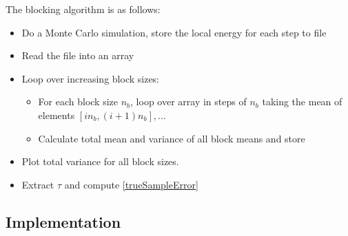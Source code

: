 \documentclass[english, a4paper]{article}
\begin{document}
\noindent The blocking algorithm is as follows:
\begin{itemize}
 \item Do a Monte Carlo simulation, store the local energy for each step to file
 \item Read the file into an array
 \item Loop over increasing block sizes:
 \begin{itemize}
     \item For each block size $n_b$, loop over array in steps of $n_b$ taking the mean of elements
           $[in_b, (i+1)n_b] , \dots $
     \item Calculate total mean and variance of all block means and store
 \end{itemize}
 \item Plot total variance for all block sizes. 
 \item Extract $\tau$ and compute \eqref{trueSampleError}
\end{itemize}





\subsection{Implementation}
\end{document}
